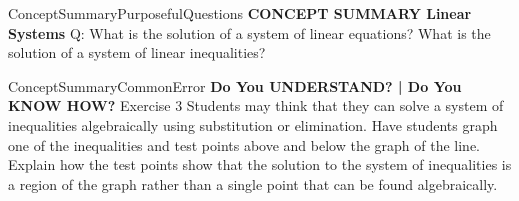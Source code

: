 \documentclass{article}
\newenvironment{te-addendum}[2]{}{}     %
\newcommand{\answer}[1]{}               %
\begin{document}
\begin{te-addendum}{ConceptSummary}{PurposefulQuestions}
\textbf{CONCEPT SUMMARY Linear Systems}
Q: What is the solution of a system of linear equations? What is the solution of a system of linear inequalities?
\answer{For a system of linear equations that has one solution, the solution is the set of ordered pairs that make all equations in the system true. It is also possible for a system of linear equations to have no solution, or infinitely many solutions. The solution of a system of linear inequalities is the set of all points that make the inequalities in the system true.}
\end{te-addendum}
\begin{te-addendum}{ConceptSummary}{CommonError}
\textbf{Do You UNDERSTAND? | Do You KNOW HOW?}
Exercise 3 Students may think that they can solve a system of inequalities algebraically using substitution or elimination. Have students graph one of the inequalities and test points above and below the graph of the line. Explain how the test points show that the solution to the system of inequalities is a region of the graph rather than a single point that can be found algebraically.
\end{te-addendum}
\end{document}
